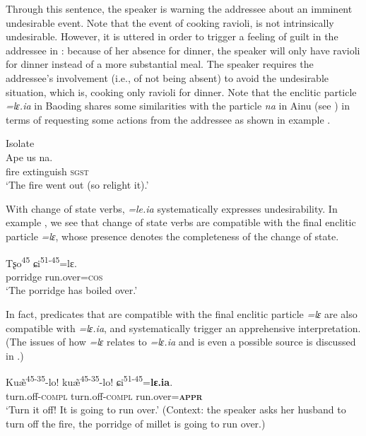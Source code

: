 \documentclass[output=paper,colorlinks,citecolor=brown, language=chinese]{langscibook}
\begin{document}
\noindent Through this sentence, the speaker is warning the addressee about an imminent undesirable event. Note that the event of cooking ravioli, is not intrinsically undesirable. However, it is uttered in order to trigger a feeling of guilt in the addressee in : because of her absence for dinner, the speaker will only have ravioli for dinner instead of a more substantial meal. The speaker requires the addressee's involvement (i.e., of not being absent) to avoid the undesirable situation, which is, cooking only ravioli for dinner. Note that the enclitic particle \textit{=lɛ.ia} in Baoding shares some similarities with the particle \textit{na} in Ainu (see \cite[176-177]{Tamura2000}) in terms of requesting some actions from the addressee as shown in example .

\ea\label{ex:Song17}
 {Isolate} {\cite[176]{Tamura2000}} \\
\gll Ape us na. \\
fire extinguish \textsc{sgst} \\
\glt `The fire went out (so relight it).'
\z

 With change of state verbs,  \textit{=le.ia} systematically expresses undesirability. In example , we see that change of state verbs are compatible with the final enclitic particle \textit{=lɛ}, whose presence denotes the completeness of the change of state. 


\ea\label{ex:Song18}
\gll Tʂo\textsuperscript{45} ɕi\textsuperscript{51-45}=lɛ. \\
porridge run.over=\textsc{cos} \\
\glt `The porridge has boiled over.'
\z

\noindent In fact, predicates that are compatible with the final enclitic particle \textit{=lɛ} are also compatible with \textit{=lɛ.ia}, and systematically trigger an apprehensive interpretation. (The issues of how \textit{=lɛ} relates to \textit{=lɛ.ia} and is even a possible source is discussed in .)

\ea\label{ex:Song19}
\gll Ku\~æ\textsuperscript{45-35}-lo! ku\~æ\textsuperscript{45-35}-lo! ɕi\textsuperscript{51-45}=\textbf{lɛ.ia}. \\
turn.off-\textsc{compl} turn.off-\textsc{compl} run.over=\textsc{\textbf{appr}} \\
\glt `Turn it off! It is going to run over.' (Context: the speaker asks her husband to turn off the fire, the porridge of millet is going to run over.)
\z
\end{document}
